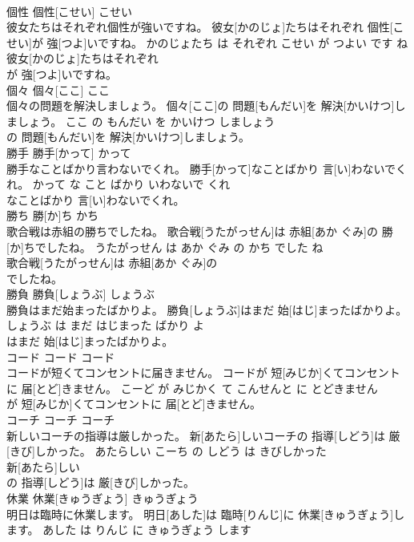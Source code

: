 \documentclass[8pt]{extreport}
\begin{document}
\begin{CJK}{UTF8}{min}
\\	個性	個性[こせい]	こせい	
\\	彼女たちはそれぞれ個性が強いですね。	彼女[かのじょ]たちはそれぞれ 個性[こせい]が 強[つよ]いですね。	かのじょたち は それぞれ こせい が つよい です ね	
\\	彼女[かのじょ]たちはそれぞれ
\\	が 強[つよ]いですね。			
\\	個々	個々[ここ]	ここ	
\\	個々の問題を解決しましょう。	個々[ここ]の 問題[もんだい]を 解決[かいけつ]しましょう。	ここ の もんだい を かいけつ しましょう	
\\	の 問題[もんだい]を 解決[かいけつ]しましょう。			
\\	勝手	勝手[かって]	かって	
\\	勝手なことばかり言わないでくれ。	勝手[かって]なことばかり 言[い]わないでくれ。	かって な こと ばかり いわないで くれ	
\\	なことばかり 言[い]わないでくれ。			
\\	勝ち	勝[か]ち	かち	
\\	歌合戦は赤組の勝ちでしたね。	歌合戦[うたがっせん]は 赤組[あか ぐみ]の 勝[か]ちでしたね。	うたがっせん は あか ぐみ の かち でした ね	
\\	歌合戦[うたがっせん]は 赤組[あか ぐみ]の
\\	でしたね。			
\\	勝負	勝負[しょうぶ]	しょうぶ	
\\	勝負はまだ始まったばかりよ。	勝負[しょうぶ]はまだ 始[はじ]まったばかりよ。	しょうぶ は まだ はじまった ばかり よ	
\\	はまだ 始[はじ]まったばかりよ。			
\\	コード	コード	コード	
\\	コードが短くてコンセントに届きません。	コードが 短[みじか]くてコンセントに 届[とど]きません。	こーど が みじかく て こんせんと に とどきません	
\\	が 短[みじか]くてコンセントに 届[とど]きません。			
\\	コーチ	コーチ	コーチ	
\\	新しいコーチの指導は厳しかった。	新[あたら]しいコーチの 指導[しどう]は 厳[きび]しかった。	あたらしい こーち の しどう は きびしかった	
\\	新[あたら]しい
\\	の 指導[しどう]は 厳[きび]しかった。			
\\	休業	休業[きゅうぎょう]	きゅうぎょう	
\\	明日は臨時に休業します。	明日[あした]は 臨時[りんじ]に 休業[きゅうぎょう]します。	あした は りんじ に きゅうぎょう します	

\end{CJK}
\end{document}
